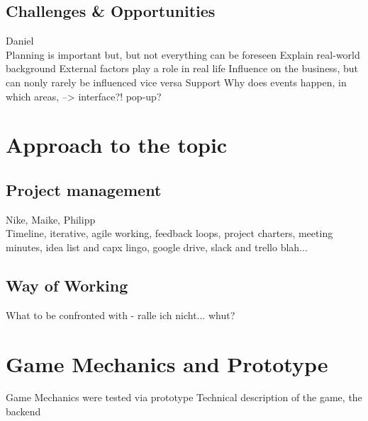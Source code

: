 \documentclass[11pt,titlepage,oneside,openany]{book}
\begin{document}
\section{Challenges \& Opportunities}
Daniel \\
Planning is important but, but not everything can be foreseen 
Explain real-world background
External factors play a role in real life
Influence on the business, but can nonly rarely be influenced vice versa
Support
Why does events happen, in which areas, --> interface?! pop-up?

\label{sec:evil}

\chapter{Approach to the topic}
\section{Project management}
Nike, Maike, Philipp \\
Timeline, iterative, agile working, feedback loops, project charters, meeting minutes, idea list and capx lingo, google drive, slack and trello blah... 
\section{Way of Working}
What to be confronted with - ralle ich nicht... whut?

\chapter{Game Mechanics and Prototype}
\label{cha:alg}
Game Mechanics were tested via prototype
Technical description of the game, the backend
\end{document}
